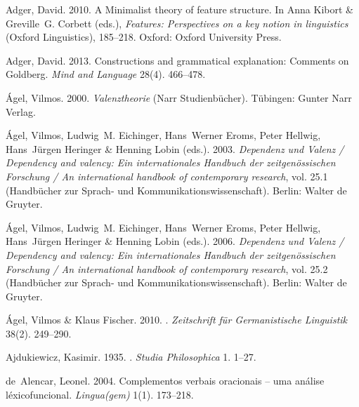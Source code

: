 \begin{thebibliography}{1420}
Adger, David. 2010.
\newblock A {Minimalist} theory of feature structure.
\newblock In Anna Kibort \& Greville~G. Corbett (eds.), \emph{Features:
  Perspectives on a key notion in linguistics}  (Oxford Linguistics), 185--218.
  Oxford: Oxford University Press.

Adger, David. 2013.
\newblock Constructions and grammatical explanation: {Comments on Goldberg}.
\newblock \emph{Mind and Language} 28(4). 466--478.

{\'A}gel, Vilmos. 2000.
\newblock \emph{Valenztheorie}  (Narr Studienb{\"u}cher).
\newblock T{\"u}bingen: Gunter Narr Verlag.

{\'A}gel, Vilmos, Ludwig~M. Eichinger, Hans~Werner Eroms, Peter Hellwig,
  Hans~J{\"u}rgen Heringer \& Henning Lobin (eds.). 2003.
\newblock \emph{{Dependenz und Valenz} / {Dependency} and valency: {Ein
  internationales Handbuch der zeitgen{\"o}ssischen Forschung} / {An}
  international handbook of contemporary research}, vol. 25.1
  (Hand\-b{\"u}\-cher zur Sprach- und Kommunikationswissenschaft).
\newblock Berlin: Walter de Gruyter.

{\'A}gel, Vilmos, Ludwig~M. Eichinger, Hans~Werner Eroms, Peter Hellwig,
  Hans~J{\"u}rgen Heringer \& Henning Lobin (eds.). 2006.
\newblock \emph{{Dependenz und Valenz} / {Dependency} and valency: {Ein
  internationales Handbuch der zeitgen{\"o}ssischen Forschung} / {An}
  international handbook of contemporary research}, vol. 25.2
  (Hand\-b{\"u}\-cher zur Sprach- und Kommunikationswissenschaft).
\newblock Berlin: Walter de Gruyter.

{\'A}gel, Vilmos \& Klaus Fischer. 2010.
.
\newblock \emph{Zeitschrift f{\"u}r Germanistische Linguistik} 38(2). 249--290.

Ajdukiewicz, Kasimir. 1935.
.
\newblock \emph{Studia Philosophica} 1. 1--27.

de~Alencar, Leonel. 2004.
\newblock Complementos verbais oracionais -- uma an{\'a}lise
  l{\'e}\-xi\-co\-fun\-ci\-o\-nal.
\newblock \emph{Lingua(gem)} 1(1). 173--218.


\end{thebibliography}
